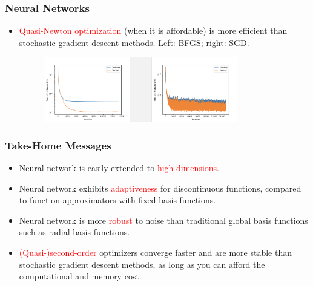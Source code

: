 \documentclass{beamer}
\newcommand{\red}[1]{\textcolor{red}{#1}}
\begin{document}
\begin{frame}

\frametitle{Neural Networks}

\begin{itemize}
	\item \red{Quasi-Newton optimization} (when it is affordable) is more efficient than stochastic gradient descent methods. Left: BFGS; right: SGD. 
	\begin{figure}[hbt]
  \includegraphics[width=0.8\textwidth]{figures/opt}
\end{figure}

\end{itemize}

\end{frame}

\begin{frame}
	\frametitle{Take-Home Messages}
	
	\begin{itemize}
	\item Neural network is easily extended to \textcolor{red}{high dimensions}. 
		\item Neural network exhibits \red{adaptiveness} for discontinuous functions, compared to function approximators with fixed basis functions.
		\item Neural network is more \red{robust} to noise than traditional global basis functions such as radial basis functions. 
		\item \red{(Quasi-)second-order} optimizers converge faster and are more stable than stochastic gradient descent methods, as long as you can afford the computational and memory cost.
	\end{itemize}
\end{frame}
\end{document}
